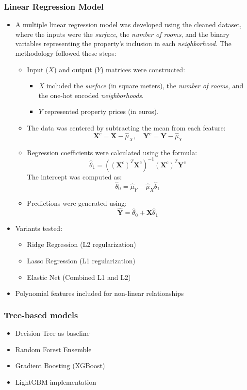 \documentclass[twocolumn]{article}
\begin{document}
\subsubsection{Linear Regression Model}
\begin{itemize}
    \item A multiple linear regression model was developed using the cleaned dataset, where the inputs were the \textit{surface}, the \textit{number of rooms}, and the binary variables representing the property’s inclusion in each \textit{neighborhood}. The methodology followed these steps:
\begin{itemize}
    \item Input (\(X\)) and output (\(Y\)) matrices were constructed:
    \begin{itemize}
        \item \(X\) included the \textit{surface} (in square meters), the \textit{number of rooms}, and the one-hot encoded \textit{neighborhoods}.
        \item \(Y\) represented property prices (in euros).
    \end{itemize}
    \item The data was centered by subtracting the mean from each feature:
    \[
    \mathbf{X}^c = \mathbf{X} - \hat{\mu}_X, \quad \mathbf{Y}^c = \mathbf{Y} - \hat{\mu}_Y
    \]
    \item Regression coefficients were calculated using the formula:
    \[
    \hat{\theta}_1 = \left( (\mathbf{X}^c)^T \mathbf{X}^c \right)^{-1} (\mathbf{X}^c)^T \mathbf{Y}^c
    \]
    The intercept was computed as:
    \[
    \hat{\theta}_0 = \hat{\mu}_Y - \hat{\mu}_X \hat{\theta}_1
    \]
    \item Predictions were generated using:
    \[
    \hat{\mathbf{Y}} = \hat{\theta}_0 + \mathbf{X} \hat{\theta}_1
    \]
\end{itemize}
    \item Variants tested:
    \begin{itemize}
        \item Ridge Regression (L2 regularization)
        \item Lasso Regression (L1 regularization)
        \item Elastic Net (Combined L1 and L2)
    \end{itemize}
    \item Polynomial features included for non-linear relationships
\end{itemize}

\subsubsection{Tree-based models}
\begin{itemize}
    \item Decision Tree as baseline
    \item Random Forest Ensemble
    \item Gradient Boosting (XGBoost)
    \item LightGBM implementation
\end{itemize}
\end{document}
